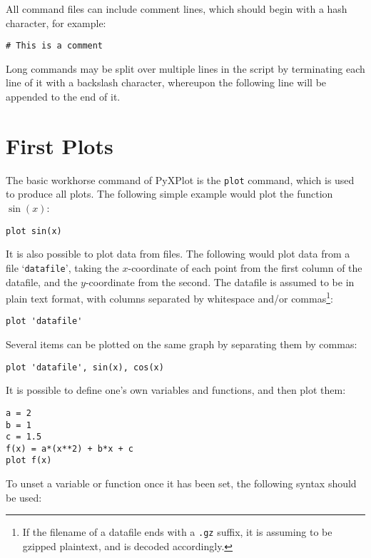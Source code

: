 All command files can include comment lines, which should begin with a hash
character, for example:

\begin{verbatim}
# This is a comment
\end{verbatim}

Long commands may be split over multiple lines in the script by terminating
each line of it with a backslash character, whereupon the following line will
be appended to the end of it.

\section{First Plots}
\label{first_plots}

The basic workhorse command of PyXPlot is the \texttt{plot} command, which is
used to produce all plots. The following simple example would plot the function
$\sin(x)$:

\begin{verbatim}
plot sin(x)
\end{verbatim}

\noindent It is also possible to plot data from files. The following would plot
data from a file `\texttt{datafile}', taking the $x$-coordinate of each point
from the first column of the datafile, and the $y$-coordinate from the second.
The datafile is assumed to be in plain text format, with columns separated by
whitespace and/or commas\footnote{If the filename of a datafile ends with a
\texttt{.gz} suffix, it is assuming to be gzipped plaintext, and is decoded
accordingly.}:

\begin{verbatim}
plot 'datafile'
\end{verbatim}

Several items can be plotted on the same graph by separating them by commas:

\begin{verbatim}
plot 'datafile', sin(x), cos(x)
\end{verbatim}

\noindent It is possible to define one's own variables and functions, and then
plot them:

\begin{verbatim}
a = 2
b = 1
c = 1.5
f(x) = a*(x**2) + b*x + c
plot f(x)
\end{verbatim}

\noindent To unset a variable or function once it has been set, the following
syntax should be
used:

